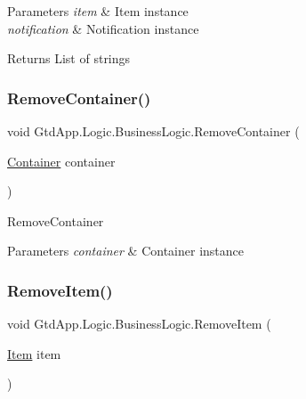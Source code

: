 \begin{DoxyParams}{Parameters}
{\em item} & Item instance\\
\hline
{\em notification} & Notification instance\\
\hline
\end{DoxyParams}
\begin{DoxyReturn}{Returns}
List of strings
\end{DoxyReturn}
\mbox{\label{class_gtd_app_1_1_logic_1_1_business_logic_a3f4cfe75f394a2ddc67edb42ef46cfdf}} 
\subsubsection{\texorpdfstring{Remove\+Container()}{RemoveContainer()}}
{\footnotesize\ttfamily void Gtd\+App.\+Logic.\+Business\+Logic.\+Remove\+Container (\begin{DoxyParamCaption}\item[{\mbox{\hyperlink{class_gtd_app_1_1_data_1_1_container}{Container}}}]{container }\end{DoxyParamCaption})}



Remove\+Container 


\begin{DoxyParams}{Parameters}
{\em container} & Container instance\\
\hline
\end{DoxyParams}
\mbox{\label{class_gtd_app_1_1_logic_1_1_business_logic_a8883b064d4c46a3a23b59650a86375a7}} 
\subsubsection{\texorpdfstring{Remove\+Item()}{RemoveItem()}}
{\footnotesize\ttfamily void Gtd\+App.\+Logic.\+Business\+Logic.\+Remove\+Item (\begin{DoxyParamCaption}\item[{\mbox{\hyperlink{class_gtd_app_1_1_data_1_1_item}{Item}}}]{item }\end{DoxyParamCaption})}



